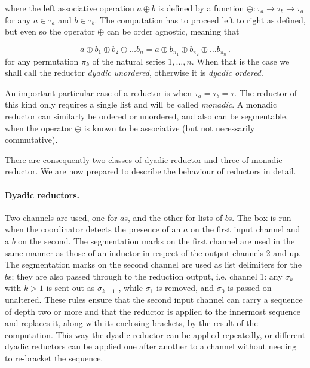 \documentclass[11pt]{report}
\begin{document}
where the left associative operation $a \oplus b$ is  defined by a function $\oplus: \tau_a\to\tau_b\to\tau_a$ for any $a\in\tau_a$ and $b\in\tau_b$.
The computation has to proceed left to right as defined, but even so the operator $\oplus$ can be order agnostic, meaning that

\[
a\oplus b_1\oplus b_2\oplus \ldots b_n=a\oplus b_{\pi_1}\oplus b_{\pi_2}\oplus \ldots b_{\pi_n}\,.
\]
for any permutation $\pi_k$ of the natural series $1,\ldots, n$. When that is the case we shall call the reductor  {\em dyadic unordered}, otherwise it is {\em dyadic ordered}.

An important particular case of a reductor is when $\tau_a=\tau_b=\tau$. The reductor of this kind only requires a single list and will be called {\em monadic}.
A monadic reductor can similarly be ordered or unordered, and also can be segmentable, when the operator $\oplus$ is known to be associative
(but not necessarily commutative).

There are consequently two classes of dyadic reductor and three of monadic reductor. We are now prepared to describe the behaviour of reductors in detail.

\paragraph{Dyadic reductors.} Two channels are used, one for $a$s, and the other for lists of $b$s. The box is run when the coordinator detects the presence of  an $a$ on the first input channel and a $b$ on the second. The segmentation marks on the first channel are used in the same
manner as those of an inductor in respect of the output channels 2 and up. The segmentation marks on the second channel are used as list delimiters for the $b$s; they are also passed through to the reduction output, i.e. channel 1: any $\sigma_k$ with $k>1$ is sent out as
$\sigma_{k-1}$ , while $\sigma_1$ is removed, and $\sigma_0$ is passed on unaltered. These rules ensure that the second input channel can carry a sequence of depth two or more and that the reductor is applied to the innermost sequence and replaces it, along with its enclosing brackets, by the result of the computation. This way the dyadic reductor can be applied repeatedly, or different dyadic reductors can be applied one after another to a channel without needing to re-bracket the sequence.
\end{document}
